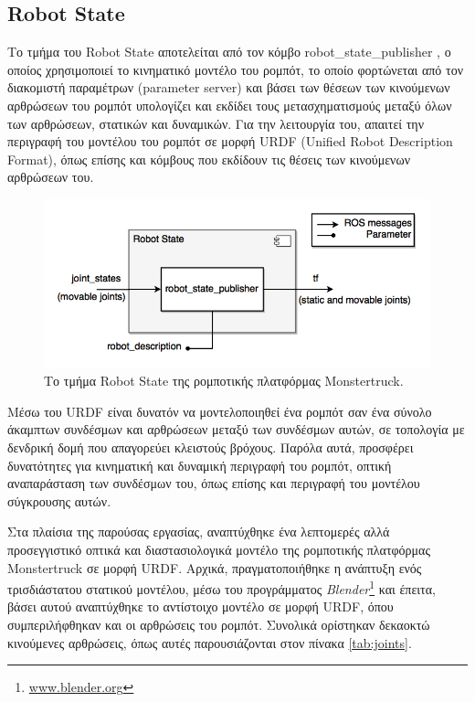 \subsection{Robot State} \label{ssec:robot_state}
Το τμήμα του Robot State αποτελείται από τον κόμβο robot{\_}state{\_}publisher \cite{robot_state_publisher}, ο οποίος χρησιμοποιεί το κινηματικό μοντέλο του ρομπότ, το οποίο φορτώνεται από τον διακομιστή παραμέτρων (parameter server) και βάσει των θέσεων των κινούμενων αρθρώσεων του ρομπότ υπολογίζει και εκδίδει τους μετασχηματισμούς μεταξύ όλων των αρθρώσεων, στατικών και δυναμικών. Για την λειτουργία του, απαιτεί την περιγραφή του μοντέλου του ρομπότ σε μορφή URDF (Unified Robot Description Format), όπως επίσης και κόμβους που εκδίδουν τις θέσεις των κινούμενων αρθρώσεων του.

\begin{figure}[!ht]
	\centering
	\includegraphics[width=0.7\linewidth]{Chapters/Chapter4/Figures/robot_state_component.png}
	\caption{Το τμήμα Robot State της ρομποτικής πλατφόρμας Monstertruck.}
	\label{fig:robot_state_component}
\end{figure}

\bigskip
Μέσω του URDF είναι δυνατόν να μοντελοποιηθεί ένα ρομπότ σαν ένα σύνολο άκαμπτων συνδέσμων και αρθρώσεων μεταξύ των συνδέσμων αυτών, σε τοπολογία με δενδρική δομή που απαγορεύει κλειστούς βρόχους. Παρόλα αυτά, προσφέρει δυνατότητες για κινηματική και δυναμική περιγραφή του ρομπότ, οπτική αναπαράσταση των συνδέσμων του, όπως επίσης και περιγραφή του μοντέλου σύγκρουσης αυτών.

\bigskip
Στα πλαίσια της παρούσας εργασίας, αναπτύχθηκε ένα λεπτομερές αλλά προσεγγιστικό οπτικά και διαστασιολογικά μοντέλο της ρομποτικής πλατφόρμας Monstertruck σε μορφή URDF. Αρχικά, πραγματοποιήθηκε η ανάπτυξη ενός τρισδιάστατου στατικού μοντέλου, μέσω του προγράμματος \textit{Blender}\footnote{\url{www.blender.org}} και έπειτα, βάσει αυτού αναπτύχθηκε το αντίστοιχο μοντέλο σε μορφή URDF, όπου συμπεριλήφθηκαν και οι αρθρώσεις του ρομπότ. Συνολικά ορίστηκαν δεκαοκτώ κινούμενες αρθρώσεις, όπως αυτές παρουσιάζονται στον πίνακα \ref{tab:joints}.

